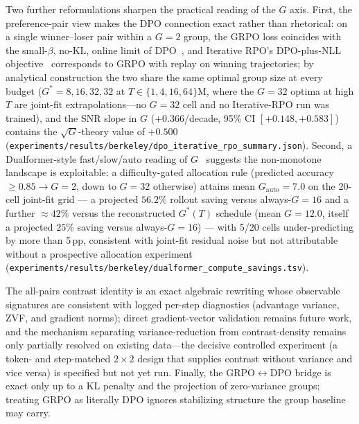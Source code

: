 \documentclass{article}
\begin{document}
Two further reformulations sharpen the practical reading of the $G$ axis.
First, the preference-pair view makes the DPO connection exact rather than
rhetorical: on a single winner--loser pair within a $G{=}2$ group, the GRPO
loss coincides with the small-$\beta$, no-KL, online limit of
DPO~\citep{rafailov2024direct}, and Iterative RPO's DPO-plus-NLL
objective~\citep{pang2024iterativerpo} corresponds to GRPO with replay on
winning trajectories; by analytical construction the two share the same
optimal group size at every budget ($G^\ast = 8, 16, 32, 32$ at
$T \in \{1, 4, 16, 64\}\mathrm{M}$, where the $G{=}32$ optima at high $T$
are joint-fit extrapolations---no $G{=}32$ cell and no Iterative-RPO run
was trained), and the SNR slope in $G$
($+0.366$/decade, 95\% CI $[+0.148, +0.583]$) contains the
$\sqrt{G}$-theory value of $+0.500$
(\texttt{experiments/results/berkeley/dpo\_iterative\_rpo\_summary.json}).
Second, a Dualformer-style fast/slow/auto reading of
$G$~\citep{su2024dualformer} suggests the non-monotone landscape is
exploitable: a difficulty-gated allocation rule (predicted accuracy
$\geq 0.85 \to G{=}2$, down to $G{=}32$ otherwise) attains mean
$G_{\mathrm{auto}} = 7.0$ on the 20-cell joint-fit grid --- a projected $56.2\%$
rollout saving versus always-$G{=}16$ and a further $\approx 42\%$ versus
the reconstructed $G^\ast(T)$ schedule (mean $G{=}12.0$, itself a projected $25\%$
saving versus always-$G{=}16$) --- with 5/20 cells under-predicting by more than 5\,pp,
consistent with joint-fit residual noise but not attributable without a
prospective allocation experiment
(\texttt{experiments/results/berkeley/dualformer\_compute\_savings.tsv}).

The all-pairs contrast identity is an exact algebraic rewriting whose
observable signatures are consistent with logged per-step diagnostics
(advantage variance, ZVF, and gradient norms); direct gradient-vector validation
remains future work, and the
mechanism separating
variance-reduction from contrast-density remains only partially resolved on
existing data---the decisive controlled experiment (a token- and step-matched
$2{\times}2$ design that supplies contrast without variance and vice versa) is
specified but not yet run. Finally, the GRPO$\leftrightarrow$DPO bridge is exact
only up to a KL penalty and the projection of zero-variance groups; treating GRPO
as literally DPO ignores stabilizing structure the group baseline may carry.
\end{document}
